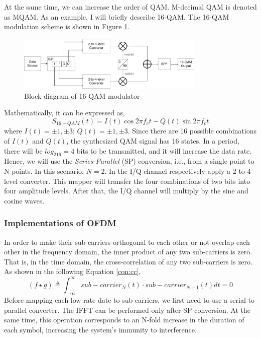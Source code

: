 \documentclass[11pt]{article}
\numberwithin{figure}{section}
\numberwithin{equation}{section}
\begin{document}
At the same time, we can increase the order of QAM. M-decimal QAM is denoted as MQAM. As an example, I will briefly describe 16-QAM. The 16-QAM modulation scheme is shown in Figure \ref{fig:structure of QAM}.
\begin{figure}[!ht]
    \centering
    \includegraphics[width=0.8\textwidth]{images/16QAM.pdf}
    \caption{Block diagram of 16-QAM modulator}
    \label{fig:structure of QAM}
\end{figure}

Mathematically, it can be expressed as,
\begin{equation}
S_{16-QAM}(t) = I(t)\cos{2\pi f_ct}-Q(t)\sin{2\pi f_ct} \label{con:16-QAM}
\end{equation}
where $I(t)=\pm 1,\pm 3$; $Q(t)=\pm 1,\pm 3$. Since there are 16 possible combinations of $I(t)$ and $Q(t)$, the synthesized QAM signal has 16 states. In a period, there will be $log_216=4$ bits to be transmitted, and it will increase the data rate. Hence, we will use the \textit{Series-Parallel} (SP) conversion, i.e., from a single point to N points. In this scenario, $N=2$. In the I/Q channel respectively apply a 2-to-4 level converter. This mapper will transfer the four combinations of two bits into four amplitude levels. After that, the I/Q channel will multiply by the sine and cosine waves. 
\subsubsection{Implementations of OFDM}
In order to make their sub-carriers orthogonal to each other or not overlap each other in the frequency domain, the inner product of any two sub-carriers is zero. That is, in the time domain, the cross-correlation of any two sub-carriers is zero. As shown in the following Equation \ref{con:cc},
\begin{equation}
(f \star g) \triangleq \int_{-\infty}^{\infty} sub-carrier_N(t) \cdot sub-carrier_{N+1}(t)dt=0 \label{con:cc}
\end{equation}
Before mapping each low-rate date to sub-carriers, we first need to use a serial to parallel converter. The IFFT can be performed only after SP conversion. At the same time, this operation corresponds to an N-fold increase in the duration of each symbol, increasing the system's immunity to interference.
\end{document}
